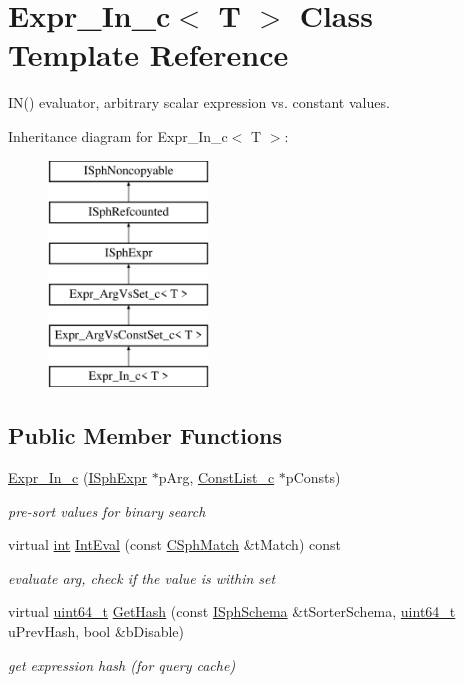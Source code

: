 \hypertarget{classExpr__In__c}{\section{Expr\-\_\-\-In\-\_\-c$<$ T $>$ Class Template Reference}
\label{classExpr__In__c}
}


I\-N() evaluator, arbitrary scalar expression vs. constant values.  


Inheritance diagram for Expr\-\_\-\-In\-\_\-c$<$ T $>$\-:\begin{figure}[H]
\begin{center}
\leavevmode
\includegraphics[height=6.000000cm]{classExpr__In__c}
\end{center}
\end{figure}
\subsection*{Public Member Functions}
\begin{DoxyCompactItemize}
\item 
\hyperlink{classExpr__In__c_a784f9fa9f33d538e196232794cec18bd}{Expr\-\_\-\-In\-\_\-c} (\hyperlink{structISphExpr}{I\-Sph\-Expr} $\ast$p\-Arg, \hyperlink{classConstList__c}{Const\-List\-\_\-c} $\ast$p\-Consts)
\begin{DoxyCompactList}\small\item\em pre-\/sort values for binary search \end{DoxyCompactList}\item 
virtual \hyperlink{sphinxexpr_8cpp_a4a26e8f9cb8b736e0c4cbf4d16de985e}{int} \hyperlink{classExpr__In__c_aeb76ed9147966eb30ae302b57eca622a}{Int\-Eval} (const \hyperlink{classCSphMatch}{C\-Sph\-Match} \&t\-Match) const 
\begin{DoxyCompactList}\small\item\em evaluate arg, check if the value is within set \end{DoxyCompactList}\item 
virtual \hyperlink{sphinxstd_8h_aaa5d1cd013383c889537491c3cfd9aad}{uint64\-\_\-t} \hyperlink{classExpr__In__c_a6b599b2dc4164abe75e58e3f10e146e3}{Get\-Hash} (const \hyperlink{classISphSchema}{I\-Sph\-Schema} \&t\-Sorter\-Schema, \hyperlink{sphinxstd_8h_aaa5d1cd013383c889537491c3cfd9aad}{uint64\-\_\-t} u\-Prev\-Hash, bool \&b\-Disable)
\begin{DoxyCompactList}\small\item\em get expression hash (for query cache) \end{DoxyCompactList}\end{DoxyCompactItemize}
